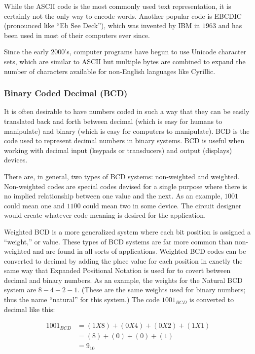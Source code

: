 While the ASCII code is the most commonly used text representation, it is certainly not the only way to encode words. Another popular code is \ac{EBCDIC} (pronounced like ``Eb See Deck''), which was invented by IBM in $ 1963 $ and has been used in most of their computers ever since.

Since the early 2000's, computer programs have begun to use Unicode character sets, which are similar to ASCII but multiple bytes are combined to expand the number of characters available for non-English languages like Cyrillic.

\subsubsection{Binary Coded Decimal (BCD)}
\label{MO:subsub:binary_coded_decimal}

It is often desirable to have numbers coded in such a way that they can be easily translated back and forth between decimal (which is easy for humans to manipulate) and binary (which is easy for computers to manipulate). \ac{BCD} is the code used to represent decimal numbers in binary systems. \ac{BCD} is useful when working with decimal input (keypads or transducers) and output (displays) devices.

There are, in general, two types of \ac{BCD} systems: non-weighted and weighted. Non-weighted codes are special codes devised for a single purpose where there is no implied relationship between one value and the next. As an example, $ 1001 $ could mean one and $ 1100 $ could mean two in some device. The circuit designer would create whatever code meaning is desired for the application. 

Weighted \ac{BCD} is a more generalized system where each bit position is assigned a ``weight,'' or value. These types of \ac{BCD} systems are far more common than non-weighted and are found in all sorts of applications. Weighted \ac{BCD} codes can be converted to decimal by adding the place value for each position in exactly the same way that Expanded Positional Notation is used for to covert between decimal and binary numbers. As an example, the weights for the Natural \ac{BCD} system are $ 8-4-2-1 $. (These are the same weights used for binary numbers; thus the name ``natural'' for this system.) The code $ 1001_{BCD} $ is converted to decimal like this: 

\begin{align}
  1001_{BCD} &= (1X8)+(0X4)+(0X2)+(1X1) \\
  \nonumber
  &= (8)+(0)+(0)+(1) \\
  \nonumber
  &= 9_{10}
\end{align}

